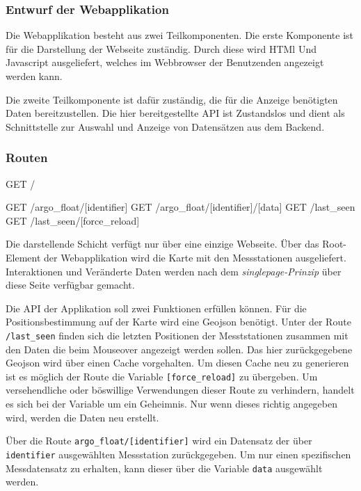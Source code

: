 \subsubsection{Entwurf der Webapplikation}

Die Webapplikation besteht aus zwei Teilkomponenten. Die erste Komponente ist für die Darstellung der Webseite zuständig. Durch diese wird HTMl Und Javascript ausgeliefert, welches im Webbrowser der Benutzenden angezeigt werden kann.

Die zweite Teilkomponente ist dafür zuständig, die für die Anzeige benötigten Daten bereitzustellen. Die hier bereitgestellte API ist Zustandslos und dient als Schnittstelle zur Auswahl und Anzeige von Datensätzen aus dem Backend. 

\subsubsection{Routen}

\begin{python}
GET     /

GET     /argo_float/[identifier]
GET     /argo_float/[identifier]/[data]
GET     /last_seen
GET     /last_seen/[force_reload]
\end{python}


Die darstellende Schicht verfügt nur über eine einzige Webseite. Über das Root-Element der Webapplikation wird die Karte mit den Messstationen ausgeliefert. Interaktionen und Veränderte Daten werden nach dem \textit{singlepage-Prinzip} über diese Seite verfügbar gemacht.

Die API der Applikation soll zwei Funktionen erfüllen können. Für die Positionsbestimmung auf der Karte wird eine Geojson benötigt. Unter der Route \texttt{/last\_seen} finden sich die letzten Positionen der Mesststationen zusammen mit den Daten die beim Mouseover angezeigt werden sollen. Das hier zurückgegebene Geojson wird über einen Cache vorgehalten. Um diesen Cache neu zu generieren ist es möglich der Route die Variable \texttt{[force\_reload]} zu übergeben. Um versehendliche oder böswillige Verwendungen dieser Route zu verhindern, handelt es sich bei der Variable um ein Geheimnis. Nur wenn dieses richtig angegeben wird, werden die Daten neu erstellt.

Über die Route \texttt{argo\_float/[identifier]} wird ein Datensatz der über \texttt{identifier} ausgewählten Messstation zurückgegeben. Um nur einen spezifischen Messdatensatz zu erhalten, kann dieser über die Variable \texttt{data} ausgewählt werden. \\


